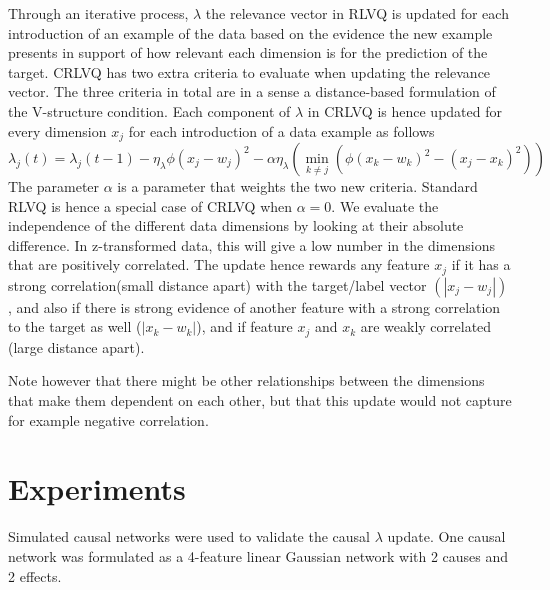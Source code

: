 \documentclass{esannV2}
\begin{document}
Through an iterative process, $\lambda$ the relevance vector in RLVQ is updated for each introduction of an example of the data based on the evidence the new example presents in support of how relevant each dimension is  for the prediction of the target. CRLVQ has two extra criteria to evaluate when updating the relevance vector. The three criteria in total are in a sense a distance-based formulation of the V-structure condition. Each component of $\lambda$ in CRLVQ is hence updated for every dimension $x_j$ for each introduction of a data example as follows
%
\begin{equation} 
\lambda_j(t) = \lambda_j(t-1) - \eta_\lambda \phi (x_j - w_j)^2 - \alpha \eta_\lambda \left( \min_{k \neq j}\left(\phi (x_k - w_k)^2 - (x_j - x_k)^2 \right) \right)
\end{equation}
%
The parameter $\alpha$ is a parameter that weights the two new criteria. Standard RLVQ is hence a special case of CRLVQ when $\alpha = 0$. We evaluate the independence of the different data dimensions by looking at their absolute difference. In z-transformed data, this will give a low number in the dimensions that are positively correlated. The update hence rewards any feature $x_j$ if it has a strong correlation(small distance apart) with the target/label vector $(|x_j - w_j|)$ , and also if there is strong evidence of another feature with a strong correlation to the target as well ($|x_k - w_k|$), and if feature $x_j$ and $x_k$ are weakly correlated (large distance apart).

Note however that there might be other relationships between the dimensions that make them dependent on each other, but that this update would not capture for example negative correlation. 

\section{Experiments}
\label{sec:Experiments}

Simulated causal networks were used to validate the causal $\lambda$ update. One causal network was formulated as a 4-feature linear Gaussian network with 2 causes and 2 effects. 
\end{document}
